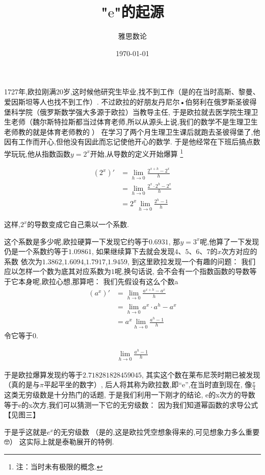 \documentclass[UTF8]{mathrep}
\title{"$\mathrm{e}$"的起源}
\date{\today}
\author{雅思数论}
\begin{document}
\maketitle

1727年,欧拉刚满20岁,这时候他研究生毕业,找不到工作（是的在当时高斯、黎曼、爱因斯坦等人也找不到工作）.
不过欧拉的好朋友丹尼尔•伯努利在俄罗斯圣彼得堡科学院（俄罗斯数学强大多源于欧拉）当教导主任,
于是欧拉就去医学院生理卫生老师（魏尔斯特拉斯都当过体育老师,所以从源头上说,我们的数学不是生理卫生老师教的就是体育老师教的🤣）
在学习了两个月生理卫生课后就跑去圣彼得堡了,他因有工作而开心,但他没有因此而忘记使他开心的数学.
于是他经常在下班后搞点数学玩玩,他从指数函数$y=2^{x} $开始,从导数的定义开始爆算
\footnote{注：当时未有极限的概念.}

\begin{align*}
  \left( 2^{x}  \right)' & = \lim_{h \to 0} \frac{2^{x+h}-2^{x}  }{h}
  \\
  & = \lim_{h \to 0} \frac{2^{x}\cdot 2^{h}-2^{x}   }{h} \\
  & = 2^{x} \lim_{h \to 0} \frac{2^{h}-1 }{h}
\end{align*}

这样,$2^{x} $的导数变成它自己乘以一个系数.

这个系数是多少呢,欧拉硬算一下发现它约等于$0.6931$,
那$y=3^x$呢,他算了一下发现仍是一个系数约等于$1.09861$,
如果继续算下去就会发现$4$、$5$、$6$、$7$的$x$次方对应的系数
依次为$1.3862$,$1.6094$,$1.7917$,$1.9459$,
到这里欧拉发现一个有趣的问题：
我们应以怎样一个数为底其对应系数为$1$呢,换句话说,
会不会有一个指数函数的导数等于它本身呢,欧拉心想,那算吧：
我们先假设有这么个数a
\begin{align*}
  \left(a^{x}\right)' & = \lim_{h \to 0} \frac{a^{x+h}-a^{x}}{h}  \\
  & = \lim_{h \to 0} a^{x}\cdot a^{h} - a^{x} \\
  & = a^{x} \lim_{h \to 0} \frac{a^{h}-1}{h}
\end{align*}
令它等于0.

\begin{align*}
  \lim_{h \to 0} \frac{a^{h}-1}{h}
\end{align*}

于是欧拉爆算发现约等于$2.718281828459045$,
其实这个数在莱布尼茨时期已被发现（真的是与$\pi $平起平坐的数字）,
后人将其称为欧拉数,即“$\mathrm{e}$”,在当时直到现在,
像$\frac{\pi}{4}$这类无穷级数是十分热门的话题,
于是我们利用一下刚才的结论,
e的x次方的导数等于e的x次方,我们可以猜测一下它的无穷级数：
因为我们知道幂函数的求导公式【见图三】

于是乎这就是$e^{x} $的无穷级数
（是的,这是欧拉凭空想象得来的,可见想象力多么重要🤓）
这实际上就是泰勒展开的特例.
\end{document}
